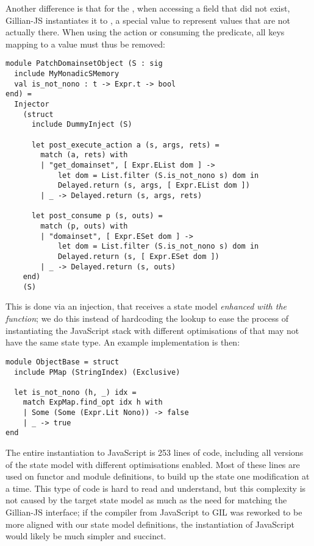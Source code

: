 Another difference is that for the \DynPMap, when accessing a field that did not exist, Gillian-JS instantiates it to , a special value to represent values that are not actually there. When using the  action or consuming the \domainset{} predicate, all keys mapping to a  value must thus be removed:
\begin{lstlisting}
module PatchDomainsetObject (S : sig
  include MyMonadicSMemory
  val is_not_nono : t -> Expr.t -> bool
end) =
  Injector
    (struct
      include DummyInject (S)

      let post_execute_action a (s, args, rets) =
        match (a, rets) with
        | "get_domainset", [ Expr.EList dom ] ->
            let dom = List.filter (S.is_not_nono s) dom in
            Delayed.return (s, args, [ Expr.EList dom ])
        | _ -> Delayed.return (s, args, rets)

      let post_consume p (s, outs) =
        match (p, outs) with
        | "domainset", [ Expr.ESet dom ] ->
            let dom = List.filter (S.is_not_nono s) dom in
            Delayed.return (s, [ Expr.ESet dom ])
        | _ -> Delayed.return (s, outs)
    end)
    (S)
\end{lstlisting}
This is done via an injection, that receives a state model \emph{enhanced with the  function}; we do this instead of hardcoding the lookup to ease the process of instantiating the JavaScript stack with different optimisations of \PMap{} that may not have the same state type. An example implementation is then:
\begin{lstlisting}
module ObjectBase = struct
  include PMap (StringIndex) (Exclusive)

  let is_not_nono (h, _) idx =
    match ExpMap.find_opt idx h with
    | Some (Some (Expr.Lit Nono)) -> false
    | _ -> true
end
\end{lstlisting}

The entire instantiation to JavaScript is 253 lines of code, including all versions of the state model with different optimisations enabled. Most of these lines are used on functor and module definitions, to build up the state one modification at a time. This type of code is hard to read and understand, but this complexity is not caused by the target state model as much as the need for matching the Gillian-JS interface; if the compiler from JavaScript to GIL was reworked to be more aligned with our state model definitions, the instantiation of JavaScript would likely be much simpler and succinct.

